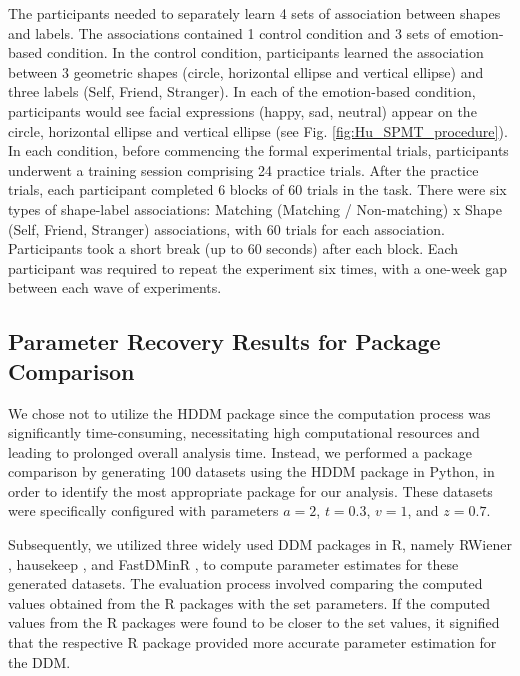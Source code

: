 \documentclass[sn-apa]{sn-jnl}%
\theoremstyle{thmstyleone}%
\theoremstyle{thmstyletwo}%
\theoremstyle{thmstylethree}%
\begin{document}
The participants needed to separately learn 4 sets of association between shapes and labels. The associations contained 1 control condition and 3 sets of emotion-based condition. In the control condition, participants learned the association between 3 geometric shapes (circle, horizontal ellipse and vertical ellipse) and three labels (Self, Friend, Stranger). In each of the emotion-based condition, participants would see facial expressions (happy, sad, neutral) appear on the circle, horizontal ellipse and vertical ellipse (see Fig. \ref{fig:Hu_SPMT_procedure}). In each condition, before commencing the formal experimental trials, participants underwent a training session comprising 24 practice trials. After the practice trials, each participant completed 6 blocks of 60 trials in the task. There were six types of shape-label associations: Matching (Matching / Non-matching) x Shape (Self, Friend, Stranger) associations, with 60 trials for each association. Participants took a short break (up to 60 seconds) after each block. Each participant was required to repeat the experiment six times, with a one-week gap between each wave of experiments.

\subsection{Parameter Recovery Results for Package Comparison }\label{sec:ParameterRecovery}

We chose not to utilize the HDDM package \parencite{wiecki2013hddm} since the computation process was significantly time-consuming, necessitating high computational resources and leading to prolonged overall analysis time. Instead, we performed a package comparison by generating 100 datasets using the HDDM package in Python, in order to identify the most appropriate package for our analysis. These datasets were specifically configured with parameters $a = 2$, $t = 0.3$, $v = 1$, and $z = 0.7$. 

Subsequently, we utilized three widely used DDM packages in R, namely RWiener \parencite{viechtbauer2010conducting}, hausekeep \parencite{Lin2019how}, and FastDMinR \parencite{voss2007fast}, to compute parameter estimates for these generated datasets. The evaluation process involved comparing the computed values obtained from the R packages with the set parameters. If the computed values from the R packages were found to be closer to the set values, it signified that the respective R package provided more accurate parameter estimation for the DDM.
\end{document}
